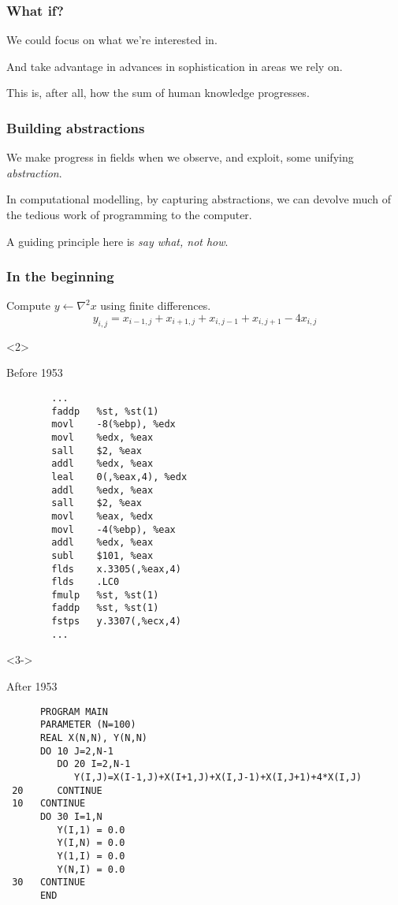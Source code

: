 \documentclass[presentation]{beamer}
\begin{document}
\begin{frame}
  \frametitle{What if?}
  We could focus on what we're interested in.

  And take advantage in advances in sophistication in areas we rely
  on.

  This is, after all, how the sum of human knowledge progresses.
\end{frame}

\begin{frame}
  \frametitle{Building abstractions}
  We make progress in fields when we observe, and exploit, some
  unifying \emph{abstraction}.

  In computational modelling, by capturing abstractions, we can
  devolve much of the tedious work of programming to the computer.

  A guiding principle here is \emph{say what, not how}.
\end{frame}

\begin{frame}[fragile, t]
  \frametitle{In the beginning}
  Compute $y \leftarrow \nabla^2 x$ using finite differences.
  \begin{equation*}
    y_{i,j} = x_{i-1, j} + x_{i+1, j} + x_{i, j-1} + x_{i, j+1} - 4x_{i,j}    
  \end{equation*}

  \begin{onlyenv}<2>
    \begin{block}{Before 1953}
\begin{verbatim}
        ...
        faddp   %st, %st(1)
        movl    -8(%ebp), %edx
        movl    %edx, %eax
        sall    $2, %eax
        addl    %edx, %eax
        leal    0(,%eax,4), %edx
        addl    %edx, %eax
        sall    $2, %eax
        movl    %eax, %edx
        movl    -4(%ebp), %eax
        addl    %edx, %eax
        subl    $101, %eax
        flds    x.3305(,%eax,4)
        flds    .LC0
        fmulp   %st, %st(1)
        faddp   %st, %st(1)
        fstps   y.3307(,%ecx,4)
        ...
\end{verbatim}
    \end{block}
  \end{onlyenv}
  \begin{onlyenv}<3->
    \begin{block}{After 1953}
\begin{verbatim}
      PROGRAM MAIN
      PARAMETER (N=100)
      REAL X(N,N), Y(N,N)
      DO 10 J=2,N-1
         DO 20 I=2,N-1
            Y(I,J)=X(I-1,J)+X(I+1,J)+X(I,J-1)+X(I,J+1)+4*X(I,J)
 20      CONTINUE
 10   CONTINUE
      DO 30 I=1,N
         Y(I,1) = 0.0
         Y(I,N) = 0.0
         Y(1,I) = 0.0
         Y(N,I) = 0.0
 30   CONTINUE
      END
\end{verbatim}
    \end{block}
  \end{onlyenv}
\end{frame}
\end{document}
